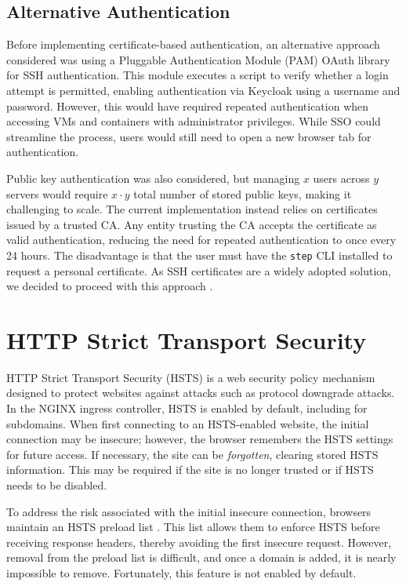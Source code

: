 \subsection{Alternative Authentication}
Before implementing certificate-based authentication, an alternative approach considered was using a Pluggable Authentication Module (PAM) OAuth library for SSH authentication. This module executes a script to verify whether a login attempt is permitted, enabling authentication via Keycloak using a username and password. However, this would have required repeated authentication when accessing VMs and containers with administrator privileges. While SSO could streamline the process, users would still need to open a new browser tab for authentication. 

Public key authentication was also considered, but managing $x$ users across $y$ servers would require $x \cdot y$ total number of stored public keys, making it challenging to scale. The current implementation instead relies on certificates issued by a trusted CA. Any entity trusting the CA accepts the certificate as valid authentication, reducing the need for repeated authentication to once every 24 hours. The disadvantage is that the user must have the \texttt{step} CLI installed to request a personal certificate. As SSH certificates are a widely adopted solution, we decided to proceed with this approach \parencite{smallstep_ssh_certificates}.

\section{HTTP Strict Transport Security}
HTTP Strict Transport Security (HSTS) is a web security policy mechanism designed to protect websites against attacks such as protocol downgrade attacks. In the NGINX ingress controller, HSTS is enabled by default, including for subdomains. When first connecting to an HSTS-enabled website, the initial connection may be insecure; however, the browser remembers the HSTS settings for future access. If necessary, the site can be \textit{forgotten}, clearing stored HSTS information. This may be required if the site is no longer trusted or if HSTS needs to be disabled.

To address the risk associated with the initial insecure connection, browsers maintain an HSTS preload list \parencite{hstspreload}. This list allows them to enforce HSTS before receiving response headers, thereby avoiding the first insecure request. However, removal from the preload list is difficult, and once a domain is added, it is nearly impossible to remove. Fortunately, this feature is not enabled by default.

